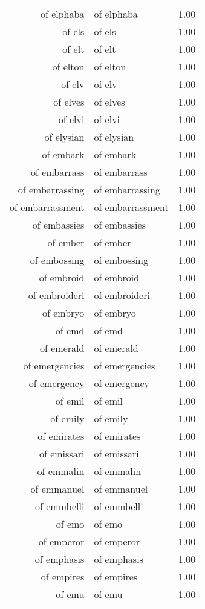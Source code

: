 \begin{table}[ht]
\begin{tabular}{rlr}
  of elphaba & of elphaba & 1.00 \\ 
  of els & of els & 1.00 \\ 
  of elt & of elt & 1.00 \\ 
  of elton & of elton & 1.00 \\ 
  of elv & of elv & 1.00 \\ 
  of elves & of elves & 1.00 \\ 
  of elvi & of elvi & 1.00 \\ 
  of elysian & of elysian & 1.00 \\ 
  of embark & of embark & 1.00 \\ 
  of embarrass & of embarrass & 1.00 \\ 
  of embarrassing & of embarrassing & 1.00 \\ 
  of embarrassment & of embarrassment & 1.00 \\ 
  of embassies & of embassies & 1.00 \\ 
  of ember & of ember & 1.00 \\ 
  of embossing & of embossing & 1.00 \\ 
  of embroid & of embroid & 1.00 \\ 
  of embroideri & of embroideri & 1.00 \\ 
  of embryo & of embryo & 1.00 \\ 
  of emd & of emd & 1.00 \\ 
  of emerald & of emerald & 1.00 \\ 
  of emergencies & of emergencies & 1.00 \\ 
  of emergency & of emergency & 1.00 \\ 
  of emil & of emil & 1.00 \\ 
  of emily & of emily & 1.00 \\ 
  of emirates & of emirates & 1.00 \\ 
  of emissari & of emissari & 1.00 \\ 
  of emmalin & of emmalin & 1.00 \\ 
  of emmanuel & of emmanuel & 1.00 \\ 
  of emmbelli & of emmbelli & 1.00 \\ 
  of emo & of emo & 1.00 \\ 
  of emperor & of emperor & 1.00 \\ 
  of emphasis & of emphasis & 1.00 \\ 
  of empires & of empires & 1.00 \\ 
  of emu & of emu & 1.00 \\ 

\end{tabular}
\end{table}
